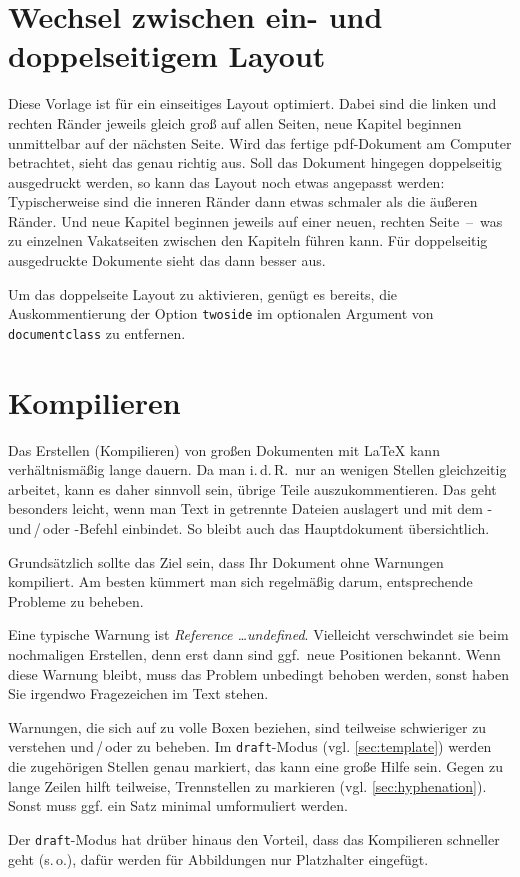\section{Wechsel zwischen ein- und doppelseitigem Layout}
Diese Vorlage ist für ein einseitiges Layout optimiert. Dabei sind die linken 
und rechten Ränder jeweils gleich groß auf allen Seiten, neue Kapitel beginnen 
unmittelbar auf
der nächsten Seite. Wird das fertige pdf-Dokument am Computer betrachtet,
sieht das genau richtig aus. Soll das Dokument hingegen doppelseitig 
ausgedruckt werden, so kann das Layout noch etwas angepasst werden: 
Typischerweise sind die inneren Ränder dann etwas schmaler als die äußeren 
Ränder. Und neue Kapitel beginnen jeweils auf einer neuen, rechten
Seite~--~was zu einzelnen Vakatseiten zwischen den Kapiteln führen kann.
Für doppelseitig ausgedruckte Dokumente sieht das dann besser aus.

Um das doppelseite Layout zu aktivieren, genügt es bereits, die 
Auskommentierung der Option \texttt{twoside} im optionalen Argument von 
\texttt{\tb documentclass} zu entfernen.

%
\section{Kompilieren}
\label{sec:compilation}
Das Erstellen (Kompilieren) von großen Dokumenten mit \LaTeX{} kann verhältnismäßig lange dauern. Da man i.\,d.\,R.\ nur an wenigen Stellen gleichzeitig arbeitet, kann es daher sinnvoll sein, übrige Teile auszukommentieren. Das geht besonders leicht, wenn man Text in getrennte Dateien auslagert und mit dem - und\,/\,oder -Befehl einbindet. So bleibt auch das Hauptdokument übersichtlich.
\par
Grundsätzlich sollte das Ziel sein, dass Ihr Dokument ohne Warnungen kompiliert. Am besten kümmert man sich regelmäßig darum, entsprechende Probleme zu beheben.
\par
Eine typische Warnung ist \glqq \emph{Reference \ldots undefined}\grqq{}. Vielleicht verschwindet sie beim nochmaligen Erstellen, denn erst dann sind ggf.\ neue Positionen bekannt. Wenn diese Warnung bleibt, muss das Problem unbedingt behoben werden, sonst haben Sie irgendwo Fragezeichen im Text stehen.
\par
Warnungen, die sich auf zu volle Boxen beziehen, sind teilweise schwieriger zu verstehen und\,/\,oder zu beheben. Im \texttt{draft}-Modus (vgl. \cref{sec:template}) werden die zugehörigen Stellen genau markiert, das kann eine große Hilfe sein. Gegen zu lange Zeilen hilft teilweise, Trennstellen zu markieren (vgl. \cref{sec:hyphenation}). Sonst muss ggf. ein Satz minimal umformuliert werden.
\par
Der \texttt{draft}-Modus hat drüber hinaus den Vorteil, dass das Kompilieren schneller geht (s.\,o.), dafür werden für Abbildungen nur Platzhalter eingefügt.
%
%
